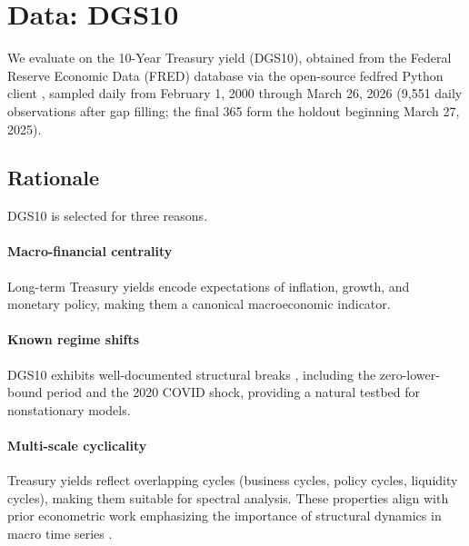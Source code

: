 \section{Data: DGS10}
We evaluate on the 10-Year Treasury yield (DGS10), obtained from the Federal Reserve Economic Data (FRED) database via the open-source fedfred Python client \cite{sunderfedfred}, sampled daily from February 1, 2000 through March 26, 2026 (9{,}551 daily observations after gap filling; the final 365 form the holdout beginning March 27, 2025).

\subsection{Rationale}
DGS10 is selected for three reasons.
\paragraph{Macro-financial centrality} Long-term Treasury yields encode expectations of inflation, growth, and monetary policy, making them a canonical macroeconomic indicator.
\paragraph{Known regime shifts} DGS10 exhibits well-documented structural breaks \cite{hamilton1989}, including the zero-lower-bound period and the 2020 COVID shock, providing a natural testbed for nonstationary models.
\paragraph{Multi-scale cyclicality} Treasury yields reflect overlapping cycles (business cycles, policy cycles, liquidity cycles), making them suitable for spectral analysis.
These properties align with prior econometric work emphasizing the importance of structural dynamics in macro time series \cite{hamilton1994}.
